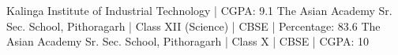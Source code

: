 
\begin{scholarship}
					{Kalinga Institute of Industrial Technology | CGPA: 9.1}
					{The Asian Academy Sr. Sec. School, Pithoragarh | Class XII (Science) | CBSE | Percentage: 83.6}
					{The Asian Academy Sr. Sec. School, Pithoragarh | Class X | CBSE | CGPA: 10}
\end{scholarship}